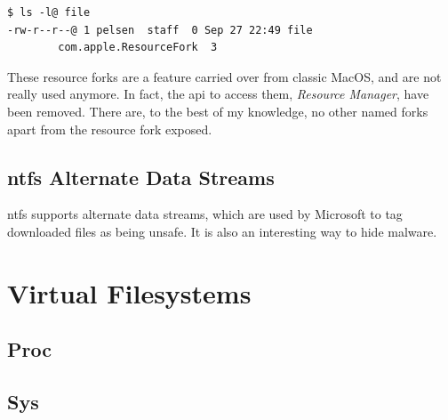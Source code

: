 \documentclass[a4paper]{article}
\begin{document}
\begin{verbatim}
$ ls -l@ file
-rw-r--r--@ 1 pelsen  staff  0 Sep 27 22:49 file
        com.apple.ResourceFork  3  
\end{verbatim}

These resource forks are a feature carried over from classic MacOS, and are not really used anymore. In fact, the \gls{api} to access them, \emph{Resource Manager}, have been removed. There are, to the best of my knowledge, no other named forks apart from the resource fork exposed.

\subsection{\gls{ntfs} Alternate Data Streams}


\gls{ntfs} supports alternate data streams, which are used by Microsoft to tag downloaded files as being unsafe. It is also an interesting way to hide malware.

\section{Virtual Filesystems}

\subsection{Proc}

\subsection{Sys}


\printglossaries
\end{document}
